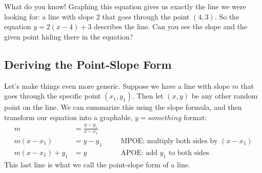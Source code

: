 \begin{center}
\end{center}
%

What do you know! Graphing this equation gives us exactly the line we were looking for: a line with slope 2 that goes through the point $(4,3)$. So the equation $y=2(x-4)+3$ describes the line. Can you see the slope and the given point hiding there in the equation?

\subsection{Deriving the Point-Slope Form}

Let's make things even more generic. Suppose we have a line with slope $m$ that goes through the specific point $(x_1, y_1)$. Then let $(x,y)$ be any other random point on the line. We can summarize this using the slope formula, and then transform our equation into a graphable, $y=something$ format:
\[\begin{aligned}
m &= \frac{y-y_1}{x-x_1}
\\
m(x-x_1) &= y-y_1
&& \quad\text{MPOE: multiply both sides by $(x-x_1)$}
\\
m(x-x_1)+y_1 &= y
&& \quad\text{APOE: add $y_1$ to both sides}
\end{aligned}\]
This last line is what we call the \gls{point-slope form} of a line.

